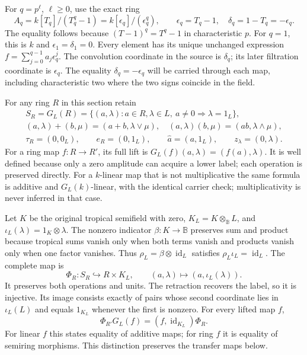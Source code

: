 For $q=p^\ell$, $\ell\ge0$, use the exact ring
\begin{equation}\tag{CFP1}
 A_q=k[T_q]/(T_q^q-1)=k[\epsilon_q]/(\epsilon_q^q),\qquad
 \epsilon_q=T_q-1,\quad \delta_q=1-T_q=-\epsilon_q.
\end{equation}
The equality follows because $(T-1)^q=T^q-1$ in
characteristic $p$. For $q=1$, this is $k$ and
$\epsilon_1=\delta_1=0$. Every element has its unique
unchanged expression $f=\sum_{j=0}^{q-1}a_j\epsilon_q^j$.
The convolution coordinate in the source is $\delta_q$;
its later filtration coordinate is $\epsilon_q$.
The equality $\delta_q=-\epsilon_q$ will be carried
through each map, including characteristic two where
the two signs coincide in the field.

For any ring $R$ in this section retain
\begin{equation}\tag{CFP2}
\begin{gathered}
 S_R=G_L(R)=\{(a,\lambda):a\in R,\lambda\in L,
                                \ a\ne0\Rightarrow\lambda=1_L\},\\
 (a,\lambda)+(b,\mu)=(a+b,\lambda\vee\mu),\quad
 (a,\lambda)(b,\mu)=(ab,\lambda\wedge\mu),\\
 \tau_R=(0,0_L),\qquad e_R=(0,1_L),\qquad
 \widehat a=(a,1_L),\qquad z_\lambda=(0,\lambda).
\end{gathered}
\end{equation}
For a ring map $f:R\to R'$, its full lift is
$G_L(f)(a,\lambda)=(f(a),\lambda)$. It is well
defined because only a zero amplitude can acquire
a lower label; each operation is preserved directly.
For a $k$-linear map that is not multiplicative the
same formula is additive and $G_L(k)$-linear, with
the identical carrier check; multiplicativity is
never inferred in that case.

Let $K$ be the original tropical semifield with zero,
$K_L=K\otimes_{\mathbb B}L$, and
$\iota_L(\lambda)=1_K\otimes\lambda$.
The nonzero indicator $\beta:K\to\mathbb B$ preserves
sum and product because tropical sums vanish only
when both terms vanish and products vanish only
when one factor vanishes. Thus
$\rho_L=\beta\otimes\operatorname{id}_L$ satisfies
$\rho_L\iota_L=\operatorname{id}_L$. The complete map is
\begin{equation}\tag{CFP3}
 \Phi_R:S_R\hookrightarrow R\times K_L,\qquad
 (a,\lambda)\longmapsto(a,\iota_L(\lambda)).
\end{equation}
It preserves both operations and units. The retraction
recovers the label, so it is injective. Its image
consists exactly of pairs whose second coordinate
lies in $\iota_L(L)$ and equals $1_{K_L}$ whenever
the first is nonzero. For every lifted map $f$,
\begin{equation}\tag{CFP4}
 \Phi_{R'}G_L(f)=(f,\operatorname{id}_{K_L})\Phi_R.
\end{equation}
For linear $f$ this states equality of additive maps;
for ring $f$ it is equality of semiring morphisms.
This distinction preserves the transfer maps below.

